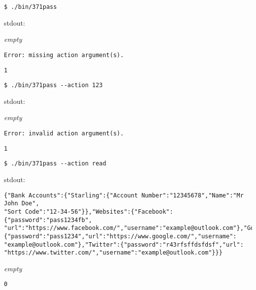 \documentclass[a4paper]{article}
\begin{document}
\begin{Verbatim}[formatcom=\bfseries]
$ ./bin/371pass
\end{Verbatim}
\begin{labeling}{ stdout:}
    \item[stdout:]
    \emph{empty}
    
    \item[stderr:]
    \begin{lstlisting}[backgroundcolor = \color{lightgray},belowskip=0pt]
Error: missing action argument(s).
    \end{lstlisting}
    
    \item[exit:]
    \texttt{1}
\end{labeling}

\begin{Verbatim}[formatcom=\bfseries]
$ ./bin/371pass --action 123
\end{Verbatim}
\begin{labeling}{ stdout:}
    \item[stdout:]
    \emph{empty}
    
    \item[stderr:]
    \begin{lstlisting}[backgroundcolor = \color{lightgray},belowskip=0pt]
Error: invalid action argument(s).
    \end{lstlisting}
    
    \item[exit:]
    \texttt{1}
\end{labeling}

\begin{Verbatim}[formatcom=\bfseries]
$ ./bin/371pass --action read  
\end{Verbatim}
\begin{labeling}{ stdout:}
    \item[stdout:]
    \begin{lstlisting}[backgroundcolor = \color{lightgray},belowskip=0pt]
{"Bank Accounts":{"Starling":{"Account Number":"12345678","Name":"Mr John Doe",
"Sort Code":"12-34-56"}},"Websites":{"Facebook":{"password":"pass1234fb",
"url":"https://www.facebook.com/","username":"example@outlook.com"},"Google":
{"password":"pass1234","url":"https://www.google.com/","username":
"example@outlook.com"},"Twitter":{"password":"r43rfsffdsfdsf","url":
"https://www.twitter.com/","username":"example@outlook.com"}}}
    \end{lstlisting}
    
    \item[stderr:]
    \emph{empty}
    
    \item[exit:]
    \texttt{0}
\end{labeling}
\end{document}
